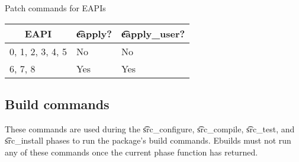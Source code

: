 \begin{centertable}{Patch commands for EAPIs}
    \label{tab:patch-commands}
    \begin{tabular}{lll}
      \toprule
      \multicolumn{1}{c}{\textbf{EAPI}} &
      \multicolumn{1}{c}{\textbf{\t{eapply}?}} &
      \multicolumn{1}{c}{\textbf{\t{eapply_user}?}} \\
      \midrule
      0, 1, 2, 3, 4, 5  & No  & No  \\
      6, 7, 8           & Yes & Yes \\
      \bottomrule
    \end{tabular}
\end{centertable}

\subsection{Build commands}
These commands are used during the \t{src_configure}, \t{src_compile}, \t{src_test},
and \t{src_install} phases to run the package's build commands. Ebuilds must not run any of these
commands once the current phase function has returned.


